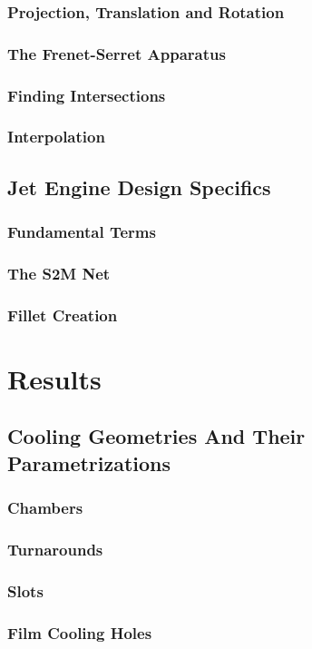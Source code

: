\documentclass[a4paper, 11pt]{report}
\theoremstyle{definition}
\begin{document}
\subsection{Projection, Translation and Rotation}
\subsection{The Frenet-Serret Apparatus}
\subsection{Finding Intersections}
\subsection{Interpolation}

\section{Jet Engine Design Specifics}
\subsection{Fundamental Terms}
\subsection{The S2M Net}
\subsection{Fillet Creation}

\chapter{Results}
\section{Cooling Geometries And Their Parametrizations}
\subsection{Chambers}
\subsection{Turnarounds}
\subsection{Slots}
\subsection{Film Cooling Holes}
\end{document}
